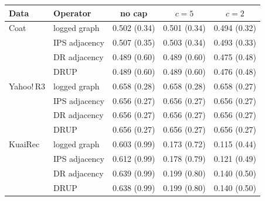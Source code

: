 \begin{tabular}{llccc}
\toprule
Data & Operator & no cap & $c=5$ & $c=2$\\
\midrule
Coat & logged graph & 0.502 (0.34) & 0.501 (0.34) & 0.494 (0.32)\\
 & IPS adjacency & 0.507 (0.35) & 0.503 (0.34) & 0.493 (0.33)\\
 & DR adjacency & 0.489 (0.60) & 0.489 (0.60) & 0.475 (0.48)\\
 & DRUP & 0.489 (0.60) & 0.489 (0.60) & 0.476 (0.48)\\
\midrule
Yahoo!\,R3 & logged graph & 0.658 (0.28) & 0.658 (0.28) & 0.658 (0.27)\\
 & IPS adjacency & 0.656 (0.27) & 0.656 (0.27) & 0.656 (0.27)\\
 & DR adjacency & 0.656 (0.27) & 0.656 (0.27) & 0.656 (0.27)\\
 & DRUP & 0.656 (0.27) & 0.656 (0.27) & 0.656 (0.27)\\
\midrule
KuaiRec & logged graph & 0.603 (0.99) & 0.173 (0.72) & 0.115 (0.44)\\
 & IPS adjacency & 0.612 (0.99) & 0.178 (0.79) & 0.121 (0.49)\\
 & DR adjacency & 0.639 (0.99) & 0.199 (0.80) & 0.140 (0.50)\\
 & DRUP & 0.638 (0.99) & 0.199 (0.80) & 0.140 (0.50)\\
\bottomrule
\end{tabular}
